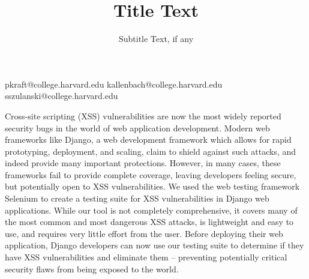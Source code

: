 \documentclass{sigplanconf}
\begin{document}
\setlength{\pdfpageheight}{\paperheight}
\setlength{\pdfpagewidth}{\paperwidth}






\title{Title Text}
\subtitle{Subtitle Text, if any}

           {pkraft@college.harvard.edu}
           {kallenbach@college.harvard.edu}
           {sszulanski@college.harvard.edu}

\maketitle

Cross-site scripting (XSS) vulnerabilities are now the most widely reported security bugs in the world of web application development.  Modern web frameworks like Django, a web development framework which allows for rapid prototyping, deployment, and scaling, claim to shield against such attacks, and indeed provide many important protections.  However, in many cases, these frameworks fail to provide complete coverage, leaving developers feeling secure, but potentially open to XSS vulnerabilities.  We used the web testing framework Selenium to create a testing suite for XSS vulnerabilities in Django web applications.  While our tool is not completely comprehensive, it covers many of the most common and most dangerous XSS attacks, is lightweight and easy to use, and requires very little effort from the user. Before deploying their web application, Django developers can now use our testing suite to determine if they have XSS vulnerabilities and eliminate them -- preventing potentially critical security flaws from being exposed to the world.
\end{document}
